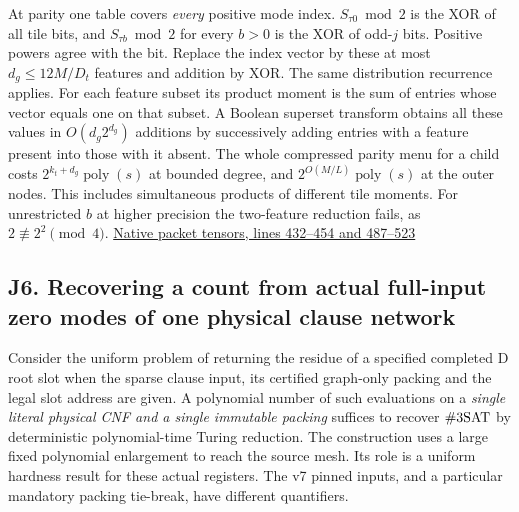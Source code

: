 \documentclass[
  11pt,
]{article}
\begin{document}
At parity one table covers \emph{every} positive mode index.
\(S_{\tau0}\bmod2\) is the XOR of all tile bits, and
\(S_{\tau b}\bmod2\) for every \(b>0\) is the XOR of odd-\(j\) bits.
Positive powers agree with the bit. Replace the index vector by these at
most \(d_g\le12M/D_t\) features and addition by XOR. The same
distribution recurrence applies. For each feature subset its product
moment is the sum of entries whose vector equals one on that subset. A
Boolean superset transform obtains all these values in \(O(d_g2^{d_g})\)
additions by successively adding entries with a feature present into
those with it absent. The whole compressed parity menu for a child costs
\(2^{k_t+d_g}\operatorname{poly}(s)\) at bounded degree, and
\(2^{O(M/L)}\operatorname{poly}(s)\) at the outer nodes. This includes
simultaneous products of different tile moments. For unrestricted \(b\)
at higher precision the two-feature reduction fails, as
\(2\not\equiv2^2\pmod4\).
\href{https://github.com/openai/math/blob/main/preprints/The-Exponential-Time-Hypothesis-is-False-October-25-2026/build/quantitative-contraction.tex\#L432}{Native
packet tensors, lines 432--454 and 487--523}

\subsection{J6. Recovering a count from actual full-input zero modes of
one physical clause
network}\label{v9-j6-recovering-a-count-from-actual-full-input-zero-modes-of-one-physical-clause-network}

Consider the uniform problem of returning the residue of a specified
completed D root slot when the sparse clause input, its certified
graph-only packing and the legal slot address are given. A polynomial
number of such evaluations on a \emph{single literal physical CNF and a
single immutable packing} suffices to recover \(\#3{\rm SAT}\) by
deterministic polynomial-time Turing reduction. The construction uses a
large fixed polynomial enlargement to reach the source mesh. Its role is
a uniform hardness result for these actual registers. The v7 pinned
inputs, and a particular mandatory packing tie-break, have different
quantifiers.
\end{document}
